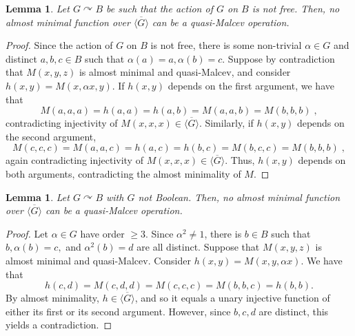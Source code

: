 \documentclass{article}
\newtheorem{lemma}[theorem]{Lemma}
\theoremstyle{remark}
\theoremstyle{definition}
\def\acts{\curvearrowright}
\begin{document}
\begin{lemma}\label{notfree} Let $G\acts B$ be such that the action of $G$ on $B$ is not free. Then, no almost minimal function over $\overline{\langle G \rangle}$ can be a quasi-Malcev operation. 
\end{lemma}
\begin{proof}
Since the action of $G$ on $B$ is not free, there is some non-trivial $\alpha\in G$ and distinct $a,b,c\in B$ such that $\alpha(a)=a, \alpha(b)=c$. Suppose by contradiction that $M(x,y,z)$ is almost minimal and quasi-Malcev, and consider $h(x,y)=M(x,\alpha x, y)$.
If $h(x,y)$ depends on the first argument, we have that
\[M(a,a,a)=h(a,a)=h(a,b)=M(a,a,b)=M(b,b,b)\;,\]
contradicting injectivity of $M(x,x,x)\in\overline{\langle G\rangle}$. 
Similarly, if $h(x,y)$ depends on the second argument,
\[M(c,c,c)=M(a,a,c)=h(a,c)=h(b,c)=M(b,c,c)=M(b,b,b)\; ,\]
again contradicting injectivity of $M(x,x,x)\in\overline{\langle G\rangle}$. Thus, $h(x,y)$ depends on both arguments, contradicting the almost minimality of $M$. 
\end{proof}

\begin{lemma}\label{notBool} Let $G\acts B$ with $G$ not Boolean. Then, no almost minimal function over $\overline{\langle G \rangle}$ can be a quasi-Malcev operation. 
\end{lemma}
\begin{proof} Let $\alpha\in G$ have order $\geq 3$. Since $\alpha^2\neq 1$, there is $b\in B$ such that $b, \alpha(b)=c,$ and $\alpha^2(b)=d$ are all distinct. Suppose that $M(x,y,z)$ is almost minimal and quasi-Malcev. Consider $h(x,y)=M(x,y,\alpha x)$. We have that 
\[h(c,d)=M(c,d,d)=M(c,c,c)=M(b,b,c)=h(b,b).\]
By almost minimality, $h\in\overline{\langle G\rangle}$, and so it equals a unary injective function of either its first or its second argument. However, since $b,c,d$ are distinct,  this yields a contradiction.
\end{proof}
\end{document}
